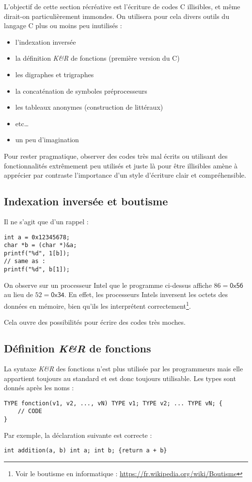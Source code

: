 \documentclass[../../../main.tex]{subfiles}
\begin{document}
L'objectif de cette section récréative est l'écriture de codes C illisibles, et même dirait-on particulièrement immondes. On utilisera pour cela divers outils du langage C plus ou moins peu inutilisés :
\begin{itemize}
	\item l'indexation inversée
	\item la définition \textit{K\&R} de fonctions (première version du C)
	\item les digraphes et trigraphes
	\item la concaténation de symboles préprocesseurs
	\item les tableaux anonymes (construction de littéraux)
	\item etc\dots
	\item un peu d'imagination
\end{itemize}
Pour rester pragmatique, observer des codes très mal écrits ou utilisant des fonctionnalités extrêmement peu utilisés et juste là pour être illisibles amène à apprécier par contraste l'importance d'un style d'écriture clair et compréhensible.
\subsection{Indexation inversée et boutisme}
Il ne s'agit que d'un rappel :
\begin{verbatim}
int a = 0x12345678;
char *b = (char *)&a;
printf("%d", 1[b]);
// same as :
printf("%d", b[1]);
\end{verbatim}
On observe sur un processeur Intel que le programme ci-dessus affiche $86 = \textsf{0x56}$ au lieu de $52 = \textsf{0x34}$. En effet, les processeurs Intels inversent les octets des données en mémoire, bien qu'ils les interprétent correctement\footnote{Voir le boutisme en informatique : \url{https://fr.wikipedia.org/wiki/Boutisme}}.
 
Cela ouvre des possibilités pour écrire des codes très moches.
\subsection{Définition \textit{K\&R} de fonctions}
La syntaxe \textit{K\&R} des fonctions n'est plus utilisée par les programmeurs mais elle appartient toujours au standard et est donc toujours utilisable. Les types sont donnés après les noms :
\begin{verbatim}
TYPE fonction(v1, v2, ..., vN) TYPE v1; TYPE v2; ... TYPE vN; {
	// CODE
}
\end{verbatim}
Par exemple, la déclaration suivante est correcte :
\begin{verbatim}
int addition(a, b) int a; int b; {return a + b}
\end{verbatim}
\end{document}
